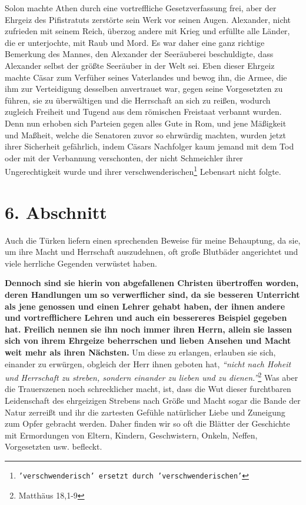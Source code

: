 \medskip

Solon machte Athen durch eine
vortreffliche Gesetzverfassung frei, aber der
Ehrgeiz des Pifistratuts zerstörte sein Werk vor
seinen Augen. Alexander, nicht
zufrieden mit seinem Reich, überzog andere mit Krieg und erfüllte alle Länder,
die er unterjochte, mit Raub und Mord. Es war daher eine ganz richtige Bemerkung
des Mannes, den Alexander der Seeräuberei beschuldigte, dass Alexander selbst
der größte Seeräuber in der Welt sei. Eben dieser Ehrgeiz machte
Cäsar zum
Verfüher seines Vaterlandes und bewog ihn, die Armee, die ihm zur
Verteidigung desselben anvertrauet war, gegen seine Vorgesetzten zu führen, sie
zu überwältigen und die Herrschaft an sich zu reißen, wodurch zugleich Freiheit
und Tugend aus dem römischen Freistaat verbannt
wurden. Denn nun erhoben sich
Parteien gegen alles Gute in Rom, und jene Mäßigkeit und
Maßheit, welche die
Senatoren zuvor so ehrwürdig machten, wurden
jetzt ihrer Sicherheit gefährlich,
indem Cäsars Nachfolger kaum jemand mit dem Tod oder mit der Verbannung
verschonten, der nicht Schmeichler ihrer Ungerechtigkeit wurde und ihrer
verschwenderischen\footnote{\texttt{'verschwenderisch' ersetzt durch
'verschwenderischen'}} Lebensart nicht folgte.

\section{6. Abschnitt} \label{kap8_ab6}

Auch die Türken liefern einen sprechenden Beweise für
meine Behauptung, da sie,
um ihre Macht und Herrschaft auszudehnen, oft große Blutbäder angerichtet und
viele herrliche Gegenden verwüstet haben.

\medskip

\label{ref:08_06_heiden}\textbf{Dennoch sind sie hierin von abgefallenen
Christen übertroffen worden, deren
Handlungen um so verwerflicher sind, da sie besseren Unterricht als jene
genossen
und einen Lehrer gehabt haben, der ihnen andere und vortrefflichere Lehren und
auch ein bessereres Beispiel gegeben hat. Freilich nennen sie ihn noch immer
ihren
Herrn, allein sie lassen sich von ihrem Ehrgeize beherrschen und lieben Ansehen
und Macht weit mehr als ihren Nächsten.} Um diese zu
erlangen, erlauben sie sich,
einander zu erwürgen,  obgleich der Herr ihnen
geboten hat,
\textit{"`nicht nach Hoheit
und Herrschaft zu streben, sondern einander zu lieben und zu
dienen."'}\footnote{Matthäus 18,1-9}
Was aber die Trauerszenen noch schrecklicher
macht, ist, dass die Wut dieser furchtbaren Leidenschaft des ehrgeizigen
Strebens nach Größe und Macht sogar die Bande der Natur zerreißt und ihr die
zartesten Gefühle natürlicher Liebe und Zuneigung zum Opfer gebracht werden.
Daher finden wir so oft die Blätter der Geschichte mit Ermordungen von Eltern,
Kindern, Geschwistern, Onkeln, Neffen, Vorgesetzten usw. befleckt.

